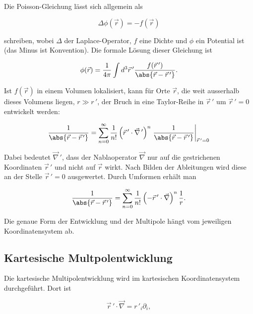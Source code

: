 Die Poisson-Gleichung lässt sich allgemein als

\begin{equation*}
\Delta \phi (\vec{r}) = - f (\vec{r})
\end{equation*}

\noindent
schreiben, wobei \(\Delta\) der Laplace-Operator, \(f\) eine Dichte und \(\phi\) ein Potential ist (das Minus ist Konvention).
Die formale Lösung dieser Gleichung ist

\begin{equation*}
\phi (\vec{r}) = \frac{1}{4\pi} \int d^3 \vec{r}\,' \frac{f (\vec{r}\,')} {\abs{\vec{r} - \vec{r}\,'}}.
\end{equation*}

\noindent
Ist \(f (\vec{r})\) in einem Volumen lokalisiert, kann für Orte \(\vec{r}\), die weit ausserhalb dieses Volumens liegen, \(r \gg r\,'\), der Bruch in eine Taylor-Reihe in \(\vec{r}\,'\) um \(\vec{r}\,' = 0\) entwickelt werden:

\begin{equation*}
\frac{1}{\abs{\vec{r} - \vec{r}\,'}} = \sum_{n=0}^{\infty} \frac{1}{n!} \left( \vec{r}\,' \cdot \vec{\nabla}\,' \right)^n \left. \frac{1}{\abs{\vec{r} - \vec{r}\,'}} \right|_{\vec{r}\,'=0}
\end{equation*}

\noindent
Dabei bedeutet \(\vec{\nabla}\,'\), dass der Nablaoperator \(\vec{\nabla}\) nur auf die gestrichenen Koordinaten \(\vec{r}\,'\) und nicht auf \(\vec{r}\) wirkt.
Nach Bilden der Ableitungen wird diese an der Stelle \(\vec{r}\,' = 0\) ausgewertet.
Durch Umformen erhält man

\begin{equation*}
\frac{1}{\abs{ \vec{r} - \vec{r}\,'}} = \sum_{n=0}^{\infty} \frac{1}{n!} \left( - \vec{r}\,' \cdot \vec{\nabla} \right)^n \frac{1}{r}.
\end{equation*}

\noindent
Die genaue Form der Entwicklung und der Multipole hängt vom jeweiligen Koordinatensystem ab.

\subsection{Kartesische Multpolentwicklung
\label{planet:subsection:kartentwicklung}}

Die kartesische Multipolentwicklung wird im kartesischen Koordinatensystem durchgeführt.
Dort ist

\begin{equation*}
\vec{r}\,' \cdot \vec{\nabla} = r\,'_{i} \partial_{i},
\end{equation*}

